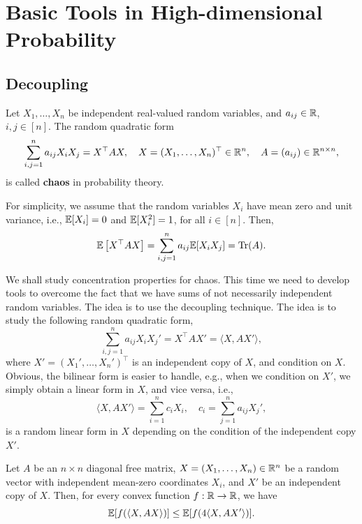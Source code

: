 \chapter{Basic Tools in High-dimensional Probability}

\section{Decoupling}

\begin{definition}[Chaos]
	Let \(X_{1},\ldots, X_{n}\) be independent real-valued random variables, and \(a_{ij}\in\mathbb{R}\), \(i, j\in[n]\). The random quadratic form
	\begin{equation*}
		\sum_{i,j=1}^{n}a_{ij}X_{i}X_{j}=X^{\top}AX,\quad X=(X_{1},\ldots, X_{n})^{\top}\in\mathbb{R}^{n},\quad A=(a_{ij})\in\mathbb{R}^{n\times n},
	\end{equation*}
	is called \textbf{chaos} in probability theory.
\end{definition}

For simplicity, we assume that the random variables \(X_{i}\)  have mean zero and unit variance, i.e., \(\mathbb{E}[X_{i}]=0\) and \(\mathbb{E}[X_{i}^2]=1\), for all \(i\in[n]\). Then,
\begin{equation*}
	\mathbb{E}\left[X^{\top}AX\right]=\sum_{i,j=1}^{n}a_{ij}\mathbb{E}[X_{i}X_{j}]=\operatorname{Tr}(A).
\end{equation*}

We shall study concentration properties for chaos. This time we need to develop tools to overcome the fact that we have sums of not necessarily independent random variables. The idea is to use the decoupling technique. The idea is to study the following random quadratic form,
\begin{equation*}
	\sum_{i,j=1}^{n}a_{ij}X_{i}X_{j}'=X^{\top}AX'=\langle X, AX'\rangle,
\end{equation*}
where \(X'=(X_{1}',\ldots, X_{n}')^{\top}\) is an independent copy of \(X\), and condition on \(X\). Obvious, the bilinear form is easier to handle, e.g., when we condition on \(X'\), we simply obtain a linear form in \(X\), and vice versa, i.e.,
\begin{equation*}
	\langle X, AX'\rangle=\sum_{i=1}^{n}c_{i}X_{i},\quad c_{i}=\sum_{j=1}^{n}a_{ij}X_{j}',
\end{equation*}
is a random linear form in \(X\) depending on the condition of the independent copy \(X'\).

\begin{theorem}[Decoupling]
	Let \(A\) be an \(n\times n\) diagonal free matrix, \(X=(X_{1},\ldots, X_{n})\in\mathbb{R}^{n}\) be a random vector with independent mean-zero coordinates \(X_{i}\), and \(X'\) be an independent copy of \(X\). Then, for every convex function \(f:\mathbb{R}\to\mathbb{R}\), we have
	\begin{equation*}
		\mathbb{E}[f(\langle X, AX\rangle)]\leq\mathbb{E}[f(4\langle X, AX'\rangle)].
	\end{equation*}
\end{theorem}

